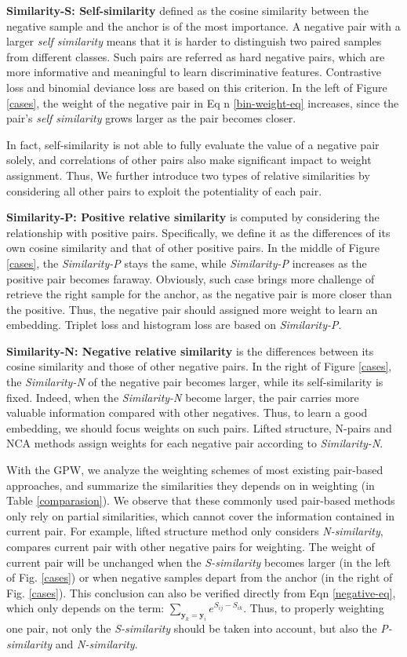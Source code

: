 \documentclass[10pt,twocolumn,letterpaper]{article}
\def\vy{{\bm{y}}}
\begin{document}
{\bf Similarity-S: Self-similarity} defined as the cosine similarity between the negative sample and the anchor is of the most importance. A negative pair with a larger \emph{self similarity} means that it is harder to distinguish two paired samples from different classes. Such pairs are referred as hard negative pairs, which are more informative and meaningful to learn discriminative features. 
Contrastive loss and binomial deviance loss are based on this criterion. In the left of Figure \ref{cases}, the weight of the negative pair in Eq n \ref{bin-weight-eq} increases, since the pair's \emph{self similarity} grows larger as the pair becomes closer.

In fact, self-similarity is not able to fully evaluate the value of a negative pair solely, and correlations of other pairs also make significant impact to weight assignment. Thus, We further introduce two types of relative similarities by considering all other pairs to exploit the potentiality of each pair.

{\bf Similarity-P: Positive relative similarity} is computed by considering the relationship with positive pairs. Specifically, we define it as the differences of its own cosine similarity and that of other positive pairs. In the middle of Figure \ref{cases}, the \emph{Similarity-P} stays the same, while \emph{Similarity-P} increases as the positive pair becomes faraway. Obviously, such case brings more challenge of retrieve the right sample for the anchor, as the negative pair is more closer than the positive. Thus, the negative pair should assigned more weight to learn an embedding. Triplet loss and histogram loss are based on \emph{Similarity-P}.

{\bf Similarity-N: Negative relative similarity} is the differences between its cosine similarity and those of other negative pairs. In the right of Figure \ref{cases}, the \emph{Similarity-N} of the negative pair becomes larger, while its self-similarity is fixed. Indeed, when the \emph{Similarity-N} become larger, the pair carries more valuable information compared with other negatives. Thus, to learn a good embedding, we should focus weights on such pairs. Lifted structure, N-pairs and NCA methods assign weights for each negative pair according to \emph{Similarity-N}.

With the GPW, we analyze the weighting schemes of most existing pair-based approaches, and summarize the similarities they depends on in weighting (in Table \ref{comparasion}). We observe that these commonly used pair-based methods only rely on partial similarities, which cannot cover the information contained in current pair. 
For example, lifted structure method only considers \emph{N-similarity}, compares current pair with other negative pairs for weighting. The weight of current pair will be unchanged when the \emph{S-similarity} becomes larger (in the left of Fig$.$ \ref{cases}) or when negative samples depart from the anchor (in the right of Fig$.$ \ref{cases}). This conclusion can also be verified directly from Eqn \ref{negative-eq}, which only depends on the term: $\sum_{\vy_k=\vy_i} e^{S_{ij}-S_{ik}}$. Thus, to properly weighting one pair, not only the \emph{S-similarity} should be taken into account, but also the \emph{P-similarity} and \emph{N-similarity}.
 
\end{document}
